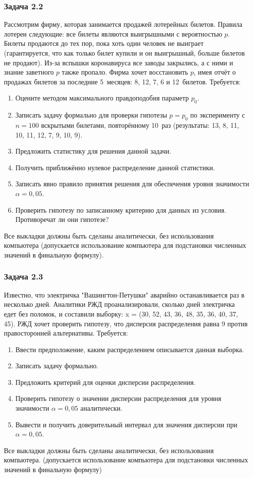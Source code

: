 \subsubsection{Задача 2.2}

Рассмотрим фирму, которая занимается продажей лотерейных билетов. Правила лотереи следующие: все билеты являются выигрышными с вероятностью $p$. Билеты продаются до тех пор, пока хоть один человек не выиграет (гарантируется, что как только билет купили и он выигрышный, больше билетов не продают).
Из-за вспышки коронавируса все заводы закрылись, а с ними и знание заветного $p$ также пропало. Фирма хочет восстановить $p$, имея отчёт о продажах билетов за последние 5~месяцев: 8, 12, 7, 6 и 12~билетов.
Требуется:
\begin{enumerate}
    \item Оцените методом максимального правдоподобия параметр $p_0$.
    \item Записать задачу формально для проверки гипотезы $p=p_0$ по эксперименту с $n=100$ вскрытыми билетами, повторённому 10~раз (результаты: 13, 8, 11, 10, 11, 12, 7, 9, 10, 9).
    \item Предложить статистику для решения данной задачи.
    \item Получить приближённо нулевое распределение данной статистики.
    \item Записать явно правило принятия решения для обеспечения уровня значимости $\alpha=0{,}05$.
    \item Проверить гипотезу по записанному критерию для данных из условия. Противоречат ли они гипотезе?
\end{enumerate}
Все выкладки должны быть сделаны аналитически, без использования компьютера (допускается использование компьютера для подстановки численных значений в финальную формулу).

\subsubsection{Задача 2.3}

Известно, что электричка "Вашингтон-Петушки" аварийно останавливается раз в несколько дней.
Аналитики РЖД проанализировали, сколько дней электричка едет без поломок, и составили выборку:
x = (30, 52, 43, 36, 48, 35, 36, 40, 37, 45).
РЖД хочет проверить гипотезу, что дисперсия распределения равна 9 против правосторонней альтернативы.
Требуется:
\begin{enumerate}
    \item Ввести предположение, каким распределением описывается данная выборка.
    \item Записать задачу формально.
    \item Предложить критерий для оценки дисперсии распределения.
    \item Проверить гипотезу о значении дисперсии распределения для уровня значимости $\alpha=0{,}05$ аналитически.
    \item Вывести и получить доверительный интервал для значения дисперсии при $\alpha=0{,}05$.
\end{enumerate}
Все выкладки должны быть сделаны аналитически, без использования компьютера. (допускается использование компьютера для подстановки численных значений в финальную формулу)

